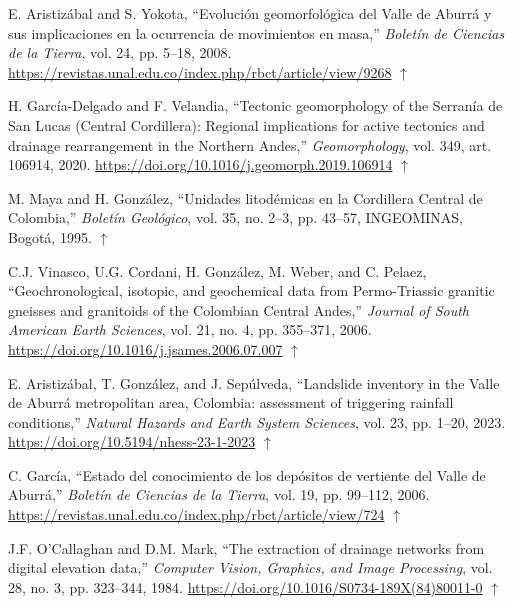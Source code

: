 \documentclass[letterpaper,11pt]{tec}
\begin{document}
{\begin{thebibliography}{}
 E. Aristizábal and S. Yokota, ``Evolución geomorfológica del Valle de Aburrá y sus implicaciones en la ocurrencia de movimientos en masa,'' {\it Boletín de Ciencias de la Tierra}, vol. 24, pp. 5--18, 2008.
\url{https://revistas.unal.edu.co/index.php/rbct/article/view/9268}
$\uparrow$\par

 H. García-Delgado and F. Velandia, ``Tectonic geomorphology of the Serranía de San Lucas (Central Cordillera): Regional implications for active tectonics and drainage rearrangement in the Northern Andes,'' {\it Geomorphology}, vol. 349, art. 106914, 2020.
\url{https://doi.org/10.1016/j.geomorph.2019.106914}
$\uparrow$\par

 M. Maya and H. González, ``Unidades litodémicas en la Cordillera Central de Colombia,'' {\it Boletín Geológico}, vol. 35, no. 2--3, pp. 43--57, INGEOMINAS, Bogotá, 1995.
$\uparrow$\par

 C.J. Vinasco, U.G. Cordani, H. González, M. Weber, and C. Pelaez, ``Geochronological, isotopic, and geochemical data from Permo-Triassic granitic gneisses and granitoids of the Colombian Central Andes,'' {\it Journal of South American Earth Sciences}, vol. 21, no. 4, pp. 355--371, 2006.
\url{https://doi.org/10.1016/j.jsames.2006.07.007}
$\uparrow$\par

 E. Aristizábal, T. González, and J. Sepúlveda, ``Landslide inventory in the Valle de Aburrá metropolitan area, Colombia: assessment of triggering rainfall conditions,'' {\it Natural Hazards and Earth System Sciences}, vol. 23, pp. 1--20, 2023.
\url{https://doi.org/10.5194/nhess-23-1-2023}
$\uparrow$\par

 C. García, ``Estado del conocimiento de los depósitos de vertiente del Valle de Aburrá,'' {\it Boletín de Ciencias de la Tierra}, vol. 19, pp. 99--112, 2006.
\url{https://revistas.unal.edu.co/index.php/rbct/article/view/724}
$\uparrow$\par

 J.F. O'Callaghan and D.M. Mark, ``The extraction of drainage networks from digital elevation data,'' {\it Computer Vision, Graphics, and Image Processing}, vol. 28, no. 3, pp. 323--344, 1984.
\url{https://doi.org/10.1016/S0734-189X(84)80011-0}
$\uparrow$\par


\end{thebibliography}}
\end{document}
